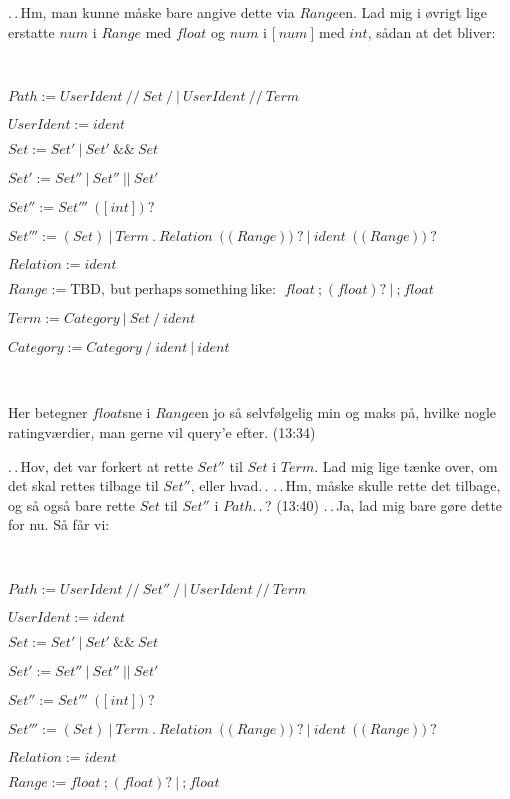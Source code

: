 \documentclass{report}
\begin{document}
.\,.\,Hm, man kunne måske bare angive dette via $Range$en. Lad mig i øvrigt lige erstatte $num$ i $Range$ med $float$ og $num$ i $\texttt{[}\ num\ \texttt{]}$ med $int$, sådan at det bliver:

\ 

$Path := UserIdent\ \texttt{//}\ Set\ \texttt{/}\ |\ UserIdent\ \texttt{//}\ Term$

$UserIdent := ident$

$Set := Set'\ |\ Set'\ \texttt{\&\&}\ Set$ 

$Set' := Set''\ |\ Set''\ \texttt{||}\ Set'$ 

$Set'' := Set'''\ (\texttt{[}\ int\ \texttt{]})? $ 

$Set''' := (Set)\ |\ 
	Term\ \texttt{.}\ Relation\ (\texttt{(}\ Range\ \texttt{)})?\ |\ 
	ident\ (\texttt{(}\ Range\ \texttt{)})?
$ 

$Relation := ident$


$Range := \mathrm{TBD,\ but\ perhaps\ something\ like\!:}\ \ 
	float\ \texttt{;}\ (float)?\ |\ 
	\texttt{;}\ float
$

$Term := Category\ |\ Set\ \texttt{/}\ ident$

$Category := Category\ \texttt{/}\ ident\ |\ ident$

\ 

Her betegner $float$sne i $Range$en jo så selvfølgelig min og maks på, hvilke nogle ratingværdier, man gerne vil query'e efter. (13:34)

.\,.\,Hov, det var forkert at rette $Set''$ til $Set$ i $Term$. Lad mig lige tænke over, om det skal rettes tilbage til $Set''$, eller hvad.\,. .\,.\,Hm, måske skulle rette det tilbage, og så også bare rette $Set$ til $Set''$ i $Path$.\,.\,? (13:40) .\,.\,Ja, lad mig bare gøre dette for nu. Så får vi:

\ 

$Path := UserIdent\ \texttt{//}\ Set''\ \texttt{/}\ |\ UserIdent\ \texttt{//}\ Term$

$UserIdent := ident$

$Set := Set'\ |\ Set'\ \texttt{\&\&}\ Set$ 

$Set' := Set''\ |\ Set''\ \texttt{||}\ Set'$ 

$Set'' := Set'''\ (\texttt{[}\ int\ \texttt{]})? $ 

$Set''' := (Set)\ |\ 
	Term\ \texttt{.}\ Relation\ (\texttt{(}\ Range\ \texttt{)})?\ |\ 
	ident\ (\texttt{(}\ Range\ \texttt{)})?
$ 

$Relation := ident$


$Range := float\ \texttt{;}\ (float)?\ |\ \texttt{;}\ float
$
\end{document}
